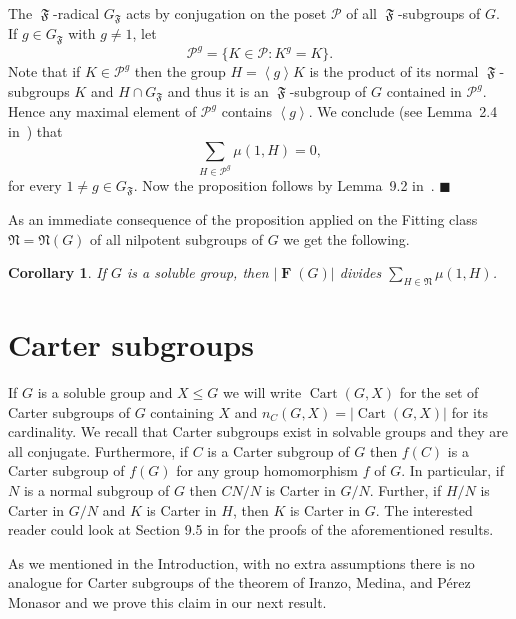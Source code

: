 \documentclass[a4paper,12pt,reqno]{amsart}
\newtheorem{corollary}[theorem]{Corollary}
\numberwithin{equation}{section}
\DeclareMathOperator{\FF}{\mathfrak{F}}
\DeclareMathOperator{\fitt}{\mathbf{F}}
\DeclareMathOperator{\cart}{Cart}
\newcommand{\gensub}[1]{\left\langle{#1}\right\rangle}
\newcommand{\card}[1]{\left\lvert{#1}\right\rvert}
\renewcommand{\leq}{\leqslant}
\newenvironment{proofof}{{\bf {Proof.} }}{\hfill $\blacksquare$ \\}
\def\NN{{\mathfrak N}}
\begin{document}
\begin{proofof}
The $\FF$-radical $G_{\FF}$ acts by conjugation on the poset $\mathcal{P}$ of all $\FF$-subgroups of $G$. 
If $g \in G_{\FF}$ with $g \neq 1$, let 
\[
\mathcal{P}^g = \{K \in \mathcal{P} : K^g = K\}. 
\]
Note that if  $K \in \mathcal{P}^g$ then the group 
$H = \gensub{g}K$ is  the product of its normal $\FF$-subgroups $K$ and $H \cap G_{\FF}$  
and thus it is an $\FF$-subgroup  of  $G$ contained in $\mathcal{P}^g$. 
Hence any maximal element of $\mathcal{P}^g$ contains $\gensub{g}$. 
We conclude (see  Lemma~2.4 in~\cite{mobius}) that 
\[
\sum_{H \in \mathcal{P}^g} \mu(1,H) = 0,
\]
for every $1 \neq g \in G_{\FF}$. 
Now the proposition follows by Lemma~9.2 in~\cite{mobius}. 
\end{proofof}

As an immediate consequence of the proposition 
applied on the Fitting class $\NN = \NN(G)$ of all nilpotent subgroups of $G$ 
we get the following.

\begin{corollary}
If $G$  is a soluble group, 
then $\card{\fitt(G)}$ divides $\sum_{H \in \NN} \mu(1,H)$.
\end{corollary}








\section{Carter subgroups}\label{Sec:3}

If $G$ is a soluble group and $X \leq G$ we will write $\cart(G, X)$ 
for the set of Carter subgroups of $G$ containing $X$ and $n_C(G,X) = \card{\cart(G, X)}$ 
for its  cardinality.
We recall that  Carter subgroups exist in solvable groups and they are all conjugate. Furthermore,  if $C$ is a Carter subgroup of $G$ 
then $f(C)$ is a Carter subgroup of $f(G)$ 
for any group homomorphism $f$ of $G$. 
In particular, if $N$ is a normal subgroup of $G$ then $CN/N$ is Carter in $G/N$. 
Further, if $H/N$ is Carter in $G/N$ and $K$ is Carter in $H$, then $K$ is Carter in $G$. The interested reader could look at Section 9.5 in \cite{Robinson1982ACI} for the proofs of the  aforementioned results.  

As we mentioned in the Introduction,
with no extra assumptions 
there is no analogue for Carter subgroups of the theorem
of Iranzo, Medina, and P\'{e}rez Monasor
and we prove this claim in our next result.
\end{document}
